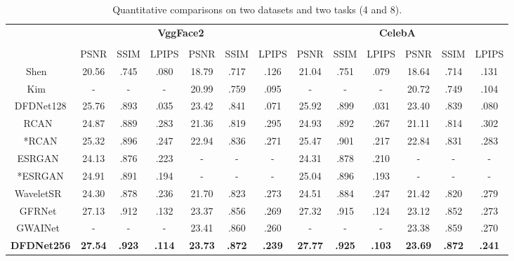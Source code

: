 \documentclass[runningheads]{llncs}
\begin{document}
\begin{table}[t]
	\centering
\scriptsize
	\renewcommand\arraystretch{1.3}
	\caption{{Quantitative comparisons on two datasets and two tasks (4 and 8).}}
\setlength{\tabcolsep}{0.5mm}
	{
		
		\begin{tabular}{|c| c c c | c c c | c c c | c c c |}
			\hline
			\rowcolor{lightgray}
			& \multicolumn{6}{c|}{\textbf{VggFace2~\cite{cao2018vggface2}}} & \multicolumn{6}{c|}{\textbf{CelebA~\cite{liu2015faceattributes}}}\\
\hhline{>{\arrayrulecolor{lightgray}}-|>{\arrayrulecolor{black}}------------}
			\rowcolor{lightgray}& \multicolumn{3}{c|}{} & \multicolumn{3}{c|}{} & \multicolumn{3}{c|}{} & \multicolumn{3}{c|}{} \\
\rowcolor{lightgray}\multirow{-3}{*}{\makecell[c]{\textbf{Methods}}}&
			\tiny PSNR &\tiny SSIM & \tiny LPIPS & \tiny PSNR & \tiny SSIM & \tiny LPIPS & \tiny PSNR & \tiny SSIM &  \multicolumn{1}{c|}{\tiny LPIPS} & \tiny PSNR & \tiny SSIM & \tiny LPIPS\\
			\hline \hline
			Shen \etal~\cite{shen2018deep}        & 20.56  & .745   & .080    &   18.79    & .717  & .126  & 21.04 & .751 & .079 & 18.64 & .714 & .131   \\
			Kim \etal~\cite{progressive_face_sr}        & -  & - & -  &   20.99    &   .759  & .095  & - & - & - & 20.72 & .749 & .104   \\
			DFDNet128  & 25.76  & .893   &  .035   &  23.42 &  .841   & .071 & 25.92 & .899 & .031 & 23.40 & .839 & .080    \\
			\hline
			RCAN~\cite{zhang2018rcan} & 24.87  & .889   & .283    &  21.36   & .819  & .295  & 24.93 & .892 & .267 & 21.11 & .814 & .302 \\
			*RCAN  & 25.32  & .896  & .247   & 22.94 &  .836   & .271    & 25.47 & .901 & .217 & 22.84 & .831 & .283 \\
			ESRGAN~\cite{wang2018esrgan} & 24.13  & .876 & .223  & - & - & - & 24.31 & .878 & .210 & - & - & - \\
			*ESRGAN & 24.91  & .891 & .194 & - & - & - & 25.04 & .896 & .193 & - & - & - \\
			WaveletSR~\cite{huang2017wavelet} & 24.30 & .878 & .236 & 21.70 & .823 & .273  & 24.51 & .884 & .247 & 21.42 & .820 & .279 \\
			GFRNet~\cite{li2018learning} &  27.13 & .912   &   .132   &    23.37     &  .856   &  .269 & 27.32 & .915 & .124 & 23.12 & .852 & .273 \\
			GWAINet~\cite{dogan2019exemplar} & - & - & - & 23.41 & .860 & .260 & - & - & - & 23.38 & .859 & .270 \\
			\textbf{DFDNet256} & \textbf{27.54} & \textbf{.923} & \textbf{.114}   & \textbf{23.73} & \textbf{.872} & \textbf{.239} & \textbf{27.77} & \textbf{.925} & \textbf{.103} & \textbf{23.69} & \textbf{.872} & \textbf{.241} \\
			\hline
	\end{tabular}}
	
	\label{tab:quan}
\end{table}
\end{document}
